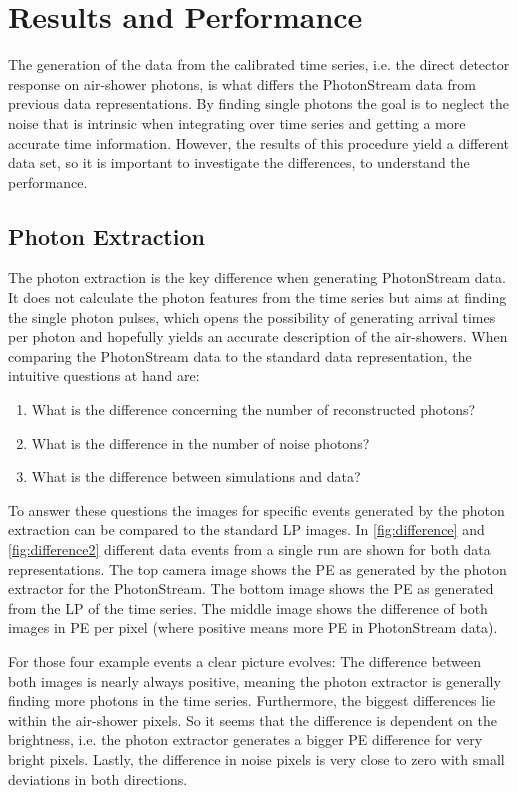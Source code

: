 \chapter{Results and Performance}
\label{ch:results}
%
The generation of the data from the calibrated time series, i.e. the direct
detector response on air-shower photons, is what differs the PhotonStream data
from previous data representations. By finding single photons the goal is to
neglect the noise that is intrinsic when integrating over time series and
getting a more accurate time information. However, the results of this procedure
yield a different data set, so it is important to investigate the differences, to understand the performance.

\section{Photon Extraction}
\label{sec:ph_ex}%
%
The photon extraction is the key difference when generating PhotonStream data.
It does not calculate the photon features from the time series but aims at
finding the single photon pulses, which opens the possibility of generating
arrival times per photon and hopefully yields an accurate description of the
air-showers. When comparing the PhotonStream data to the standard data
representation, the intuitive questions at hand are:
%
\begin{enumerate}
  \item What is the difference concerning the number of reconstructed photons?
  \item What is the difference in the number of noise photons?
  \item What is the difference between simulations and data?
\end{enumerate}
%
To answer these questions the images for specific events generated by the
photon extraction can be compared to the standard LP images. In
\autoref{fig:difference} and \autoref{fig:difference2} different data events
from a single run are shown for both data representations. The top camera image
shows the PE as generated by the photon extractor for the PhotonStream. The
bottom image shows the PE as generated from the LP of the time series. The
middle image shows the difference of both images in PE per pixel (where
positive means more PE in PhotonStream data).

For those four example events a clear picture evolves: The difference between
both images is nearly always positive, meaning the photon extractor is
generally finding more photons in the time series. Furthermore, the biggest
differences lie within the air-shower pixels. So it seems that the difference
is dependent on the brightness, i.e. the photon extractor generates a bigger
PE difference for very bright pixels. Lastly, the difference in noise pixels is
very close to zero with small deviations in both directions.

